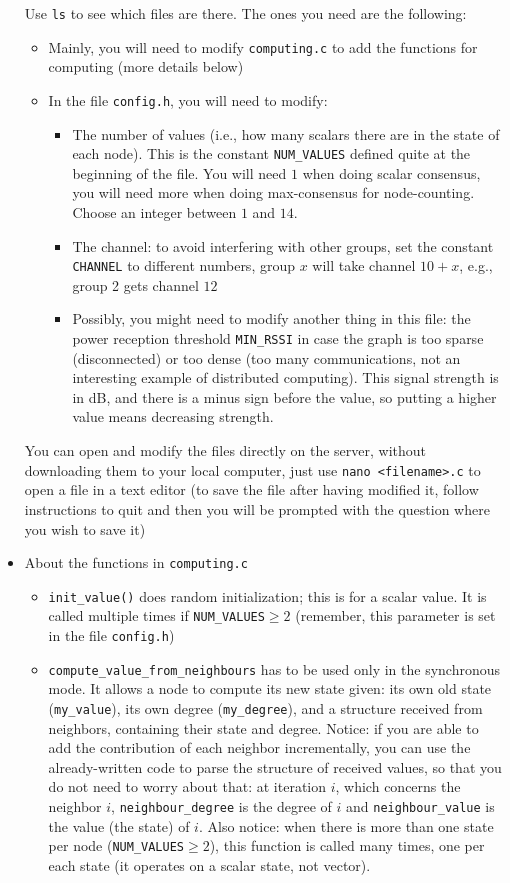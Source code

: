 \documentclass{article}
\begin{document}
\begin{itemize}
Use \verb=ls= to see which files are there. The ones you need are the following:
	\begin{itemize}
	\item Mainly, you will need to modify \verb=computing.c= to add the functions for computing (more details below)
	\item In the file \verb=config.h=, you will need to modify:
		\begin{itemize}
        \item The number of values (i.e., how many scalars there are in the state
            of each node). This is the constant \verb=NUM_VALUES= defined
            quite at the beginning of the file. You will need $1$ when doing
            scalar consensus, you will need more when doing max-consensus
            for node-counting. Choose an integer between $1$ and $14$.
		\item The channel: to avoid interfering with other groups, set the
            constant \verb=CHANNEL= to different numbers, group $x$ will take
            channel $10+x$, e.g., group 2 gets channel $12$
		\item Possibly, you might  need to modify another thing in this file:
            the power reception threshold \verb=MIN_RSSI= in case the graph is
            too sparse (disconnected) or too dense (too many communications, not
            an interesting example of distributed computing). This signal
            strength is in dB, and there is a minus sign before the value,
            so putting a higher value means decreasing strength.
		\end{itemize}
	\end{itemize}
You can open and modify the files directly on the server, without downloading them to your local computer, just use \verb=nano <filename>.c= to open a file in a text editor (to save the file after having modified it, follow instructions to quit and then you will be prompted with the question where you wish to save it)
\item About the functions in \verb=computing.c=
	\begin{itemize}
	\item  \verb=init_value()= does random initialization; this is for a scalar value.
        It is called multiple times if \verb=NUM_VALUES=$\ge 2$ (remember,
        this parameter is set in the file \verb=config.h=)
	\item \verb=compute_value_from_neighbours= has to be used only in the synchronous mode. It allows a node to compute its new state given: its own old state (\verb=my_value=), its own degree (\verb=my_degree=), and a structure received from neighbors, containing their state and degree. Notice: if you are able to add the contribution of each neighbor incrementally, you can use the already-written code to parse the structure of received values, so that you do not need to worry about that: at iteration $i$, which concerns the neighbor $i$, \verb=neighbour_degree= is the degree of $i$ and \verb=neighbour_value= is the value (the state) of $i$. Also notice: when there is more than one state per node (\verb=NUM_VALUES=$\ge 2$), this function is called many times, one per each state (it operates on a scalar state, not vector).

\end{itemize}
\end{itemize}
\end{document}
